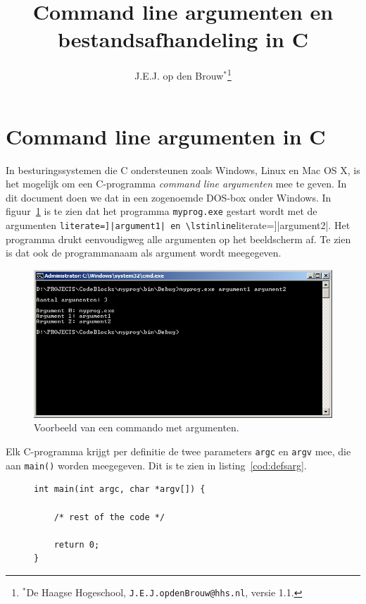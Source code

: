 \documentclass[a4paper,12pt,twoside]{article}
\author{J.E.J. op den Brouw$^*$\thanks{$^*$De Haagse Hogeschool, \texttt{\footnotesize J.E.J.opdenBrouw@hhs.nl}, versie 1.1.}}
\title{Command line argumenten en bestandsafhandeling in C}
\begin{document}
\maketitle

\section{Command line argumenten in C}
In besturingssystemen die C ondersteunen zoals Windows, Linux en Mac OS X, 
is het mogelijk om een C-programma \textsl{command line argumenten} mee te geven. In
dit document doen we dat in een zogenoemde DOS-box onder Windows. In figuur~\ref{fig:vbarg}
is te zien dat het programma \lstinline|myprog.exe| gestart wordt met de argumenten
\lstinline[literate=]|argument1| en \lstinline[literate=]|argument2|. Het programma drukt
eenvoudigweg alle argumenten op het beeldscherm af. Te zien is dat ook de programmanaam
als argument wordt meegegeven.

\begin{figure}[!ht]
\centering
\includegraphics[width=\textwidth]{myprog.png}
\caption{Voorbeeld van een commando met argumenten.}
\label{fig:vbarg}
\end{figure}


Elk C-programma krijgt per definitie de twee parameters \lstinline|argc| en \lstinline|argv|
mee, die aan \lstinline|main()|
worden meegegeven. Dit is te zien in listing~\ref{cod:defsarg}.

\begin{figure}[!ht]
\begin{lstlisting}[caption=Declaratie van de command line parameters.,label=cod:defsarg]
int main(int argc, char *argv[]) {

    /* rest of the code */
    
    return 0;
}
\end{lstlisting}
\end{figure}
\end{document}
